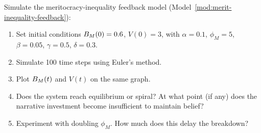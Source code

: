 \begin{exercise}[Computational]
Simulate the meritocracy-inequality feedback model (Model~\ref{mod:merit-inequality-feedback}):
\begin{enumerate}[nosep]
  \item Set initial conditions $B_{M}(0) = 0.6$, $V(0) = 3$, with $\alpha = 0.1$, $\phi_M = 5$, $\beta = 0.05$, $\gamma = 0.5$, $\delta = 0.3$.
  \item Simulate 100 time steps using Euler's method.
  \item Plot $B_{M}(t)$ and $V(t)$ on the same graph.
  \item Does the system reach equilibrium or spiral? At what point (if any) does the narrative investment become insufficient to maintain belief?
  \item Experiment with doubling $\phi_M$. How much does this delay the breakdown?
\end{enumerate}
\end{exercise}
